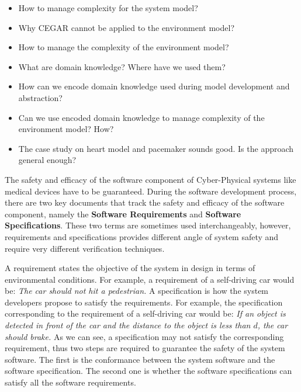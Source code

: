 \documentclass{llncs}
\begin{document}
\begin{itemize}
    \item How to manage complexity for the system model?
    \item Why CEGAR cannot be applied to the environment model?
    \item How to manage the complexity of the environment model?
    \item What are domain knowledge? Where have we used them?
    \item How can we encode domain knowledge used during model development and abstraction?
    \item Can we use encoded domain knowledge to manage complexity of the environment model? How?
    \item The case study on heart model and pacemaker sounds good. Is the approach general enough?
\end{itemize}

The safety and efficacy of the software component of Cyber-Physical systems like medical devices have to be guaranteed. During the software development process, there are two key documents that track the safety and efficacy of the software component, namely the \textbf{Software Requirements} and \textbf{Software Specifications}. These two terms are sometimes used interchangeably, however, requirements and specifications provides different angle of system safety and require very different verification techniques.

A requirement states the objective of the system in design in terms of environmental conditions. For example, a requirement of a self-driving car would be: \emph{The car should not hit a pedestrian.} A specification is how the system developers propose to satisfy the requirements. For example, the specification corresponding to the requirement of a self-driving car would be: \emph{If an object is detected in front of the car and the distance to the object is less than $d$, the car should brake.} As we can see, a specification may not satisfy the corresponding requirement, thus two steps are required to guarantee the safety of the system software. The first is the conformance between the system software and the software specification. The second one is whether the software specifications can satisfy all the software requirements.
\end{document}
